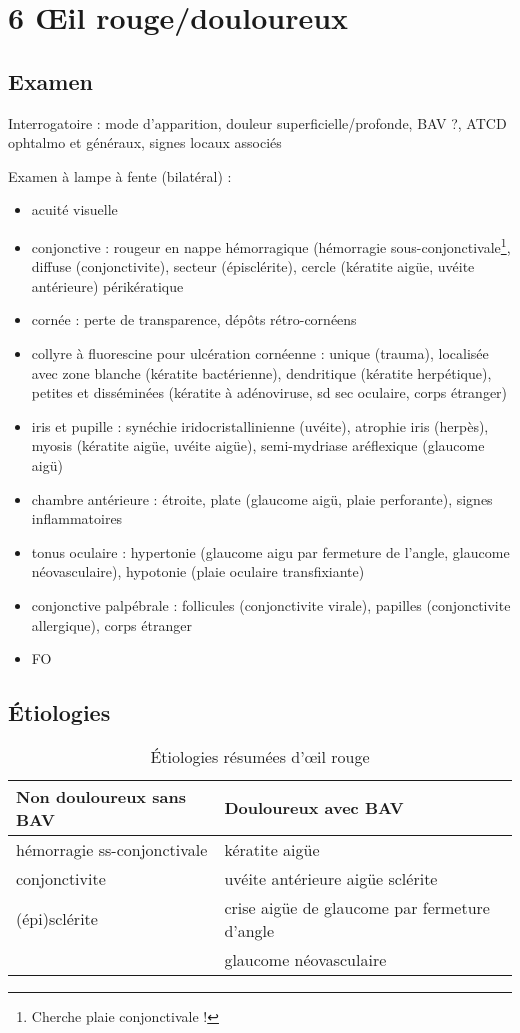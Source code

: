 \documentclass[11pt]{article}
\begin{document}
\section{6 \OE{}il rouge/douloureux}
\label{sec:org690defa}
\subsection{Examen}
\label{sec:org0dc3a9e}
Interrogatoire : mode d'apparition, douleur superficielle/profonde, BAV
   ?, ATCD ophtalmo et généraux, signes locaux associés

Examen à lampe à fente (bilatéral) :
\begin{itemize}
\item acuité visuelle
\item conjonctive : rougeur en nappe hémorragique (hémorragie
sous-conjonctivale\footnote{Cherche plaie conjonctivale !}, diffuse (conjonctivite), secteur (épisclérite),
cercle (kératite aigüe, uvéite antérieure)
périkératique
\item cornée : perte de transparence, dépôts rétro-cornéens
\item collyre à fluorescine pour ulcération cornéenne : unique (trauma), localisée
avec zone blanche (kératite bactérienne), dendritique (kératite herpétique),
petites et disséminées (kératite à adénoviruse, sd sec oculaire, corps
étranger)
\item iris et pupille : synéchie iridocristallinienne (uvéite), atrophie iris
(herpès), myosis (kératite aigüe, uvéite aigüe), semi-mydriase
aréflexique (glaucome aigü)
\item chambre antérieure : étroite, plate (glaucome aigü, plaie perforante), signes inflammatoires
\item tonus oculaire : hypertonie (glaucome aigu par fermeture de l'angle, glaucome
néovasculaire), hypotonie (plaie oculaire transfixiante)
\item conjonctive palpébrale : follicules (conjonctivite virale), papilles
(conjonctivite allergique), corps étranger
\item FO
\end{itemize}

\subsection{Étiologies}
\label{sec:orga4d921f}

\begin{table}[htbp]
\caption{Étiologies résumées d'\oe{}il rouge}
\centering
\begin{tabular}{ll}
\toprule
Non douloureux sans BAV & Douloureux avec BAV\\
\midrule
hémorragie ss-conjonctivale & kératite aigüe\\
conjonctivite & uvéite antérieure aigüe sclérite\\
(épi)sclérite & crise aigüe de glaucome par fermeture d'angle\\
 & glaucome néovasculaire\\
\bottomrule
\end{tabular}
\end{table}
\end{document}
